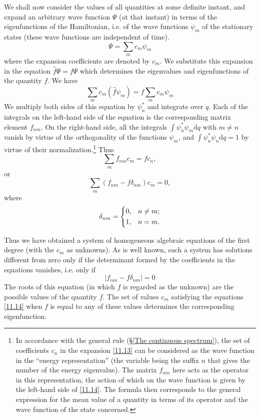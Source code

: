 We shall now consider the values of all quantities at some definite instant, and expand an arbitrary wave function $ \Psi $ (at that instant) in terms of the eigenfunctions of the Hamiltonian, i.e. of the wave functions $\psi_m$ of the stationary states (these wave functions are independent of time).
\begin{equation}\label{11.13}
\Psi=\sum_{m}c_m\psi_m
\end{equation}
where the expansion coefficients are denoted by $ c_m $. We substitute this expansion in the equation $ \hat{f}\Psi=f\Psi $ which determines the eigenvalues and eigenfunctions of the quantity $ f $. We have
\[ \sum_{m}c_m(\hat{f}\psi_m)=f\sum_{m}c_m\psi_m \]
We multiply both sides of this equation by $\psi_n^*$ and integrate over $ q $. Each of the integrals on the left-hand side of the equation is the corresponding matrix element $ f_{nm} $. On the right-hand side, all the integrals $ \int\psi_n^*\psi_m\mathrm{d}q $ with $ m\ne n $ vanish by virtue of the orthogonality of the functions $\psi_m$, and $ \int\psi_n^*\psi_n\mathrm{d}q=1 $ by virtue of their normalization.\footnote{In accordance with the general rule (\S\ref{The continuous spectrum}), the set of coefficients $ c_n $ in the expansion \eqref{11.13} can be considered as the wave function in the “energy representation” (the variable being the suffix $ n $ that gives the number of the energy eigenvalue). The matrix $ f_{nm} $ here acts as the operator in this representation, the action of which on the wave function is given by the left-hand side of \eqref{11.14}. The formula then corresponds to the general expression for the mean value of a quantity in terms of its operator and the wave function of the state concerned.
} Thus
\begin{equation}\label{11.14}
\sum_{m}f_{nm}c_m=fc_n,
\end{equation}
or
\[ \sum_{m}(f_{nm}-f\delta_{nm})c_m=0, \]
where 
\[ \delta_{nm}=\begin{dcases}
0, &n\neq m;\\
1, &n=m.
\end{dcases} \]

Thus we have obtained a system of homogeneous algebraic equations of the first degree (with the $ c_m $ as unknowns). As is well known, such a system has solutions different from zero only if the determinant formed by the coefficients in the equations vanishes, i.e. only if
\begin{equation}\label{11.15}
|f_{nm}-f\delta_{nm}|=0
\end{equation}
The roots of this equation (in which $ f $ is regarded as the unknown) are the possible values of the quantity $ f $. The set of values $ c_m $ satisfying the equations \eqref{11.14} when $ f $ is equal to any of these values determines the corresponding eigenfunction.

